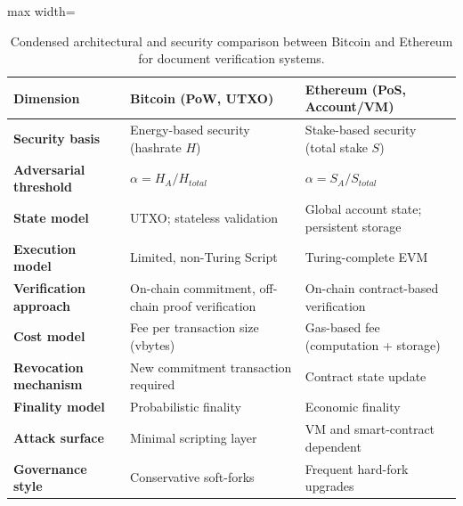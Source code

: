 \begin{table}[t]
\caption{Condensed architectural and security comparison between Bitcoin and Ethereum for document verification systems.}
\label{tab:btc_eth_comparison}
\centering
\small
\renewcommand{\arraystretch}{1.2}
\setlength{\tabcolsep}{4pt}

\begin{adjustbox}{max width=\linewidth}
\begin{tabular}{
>{\raggedright\arraybackslash\bfseries}m{3.0cm}
>{\raggedright\arraybackslash}m{6.2cm}
>{\raggedright\arraybackslash}m{6.2cm}
}
\toprule
Dimension & Bitcoin (PoW, UTXO) & Ethereum (PoS, Account/VM) \\
\midrule

Security basis &
Energy-based security (hashrate $H$) &
Stake-based security (total stake $S$) \\

Adversarial threshold &
$\alpha = H_A/H_{total}$ &
$\alpha = S_A/S_{total}$ \\

State model &
UTXO; stateless validation &
Global account state; persistent storage \\

Execution model &
Limited, non-Turing Script &
Turing-complete EVM \\

Verification approach &
On-chain commitment, off-chain proof verification &
On-chain contract-based verification \\

Cost model &
Fee per transaction size (vbytes) &
Gas-based fee (computation + storage) \\

Revocation mechanism &
New commitment transaction required &
Contract state update \\

Finality model &
Probabilistic finality &
Economic finality \\

Attack surface &
Minimal scripting layer &
VM and smart-contract dependent \\

Governance style &
Conservative soft-forks &
Frequent hard-fork upgrades \\

\bottomrule
\end{tabular}
\end{adjustbox}

\end{table}